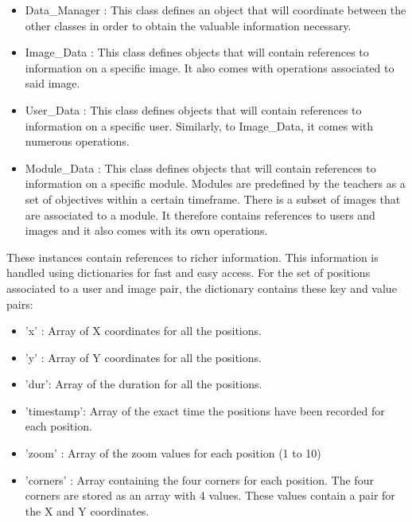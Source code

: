 \documentclass[a4paper,11pt]{report}
\numberwithin{figure}{section} %
\begin{document}
    \begin{itemize}
        \item[\textbullet] Data\_Manager : This class defines an object that will coordinate between the other classes in order to obtain the valuable information necessary.
        \item[\textbullet] Image\_Data : This class defines objects that will contain references to information on a specific image.
        It also comes with operations associated to said image.
        \item[\textbullet] User\_Data : This class defines objects that will contain references to information on a specific user.
        Similarly, to Image\_Data, it comes with numerous operations.
        \item[\textbullet] Module\_Data : This class defines objects that will contain references to information on a specific module.
        Modules are predefined by the teachers as a set of objectives within a certain timeframe.
        There is a subset of images that are associated to a module.
        It therefore contains references to users and images and it also comes with its own operations.
    \end{itemize}

    These instances contain references to richer information.
    This information is handled using dictionaries for fast and easy access.
    For the set of positions associated to a user and image pair, the dictionary contains these key and value pairs:
    \begin{itemize}
        \item[\textbullet] 'x' : Array of X coordinates for all the positions.
        \item[\textbullet] 'y' : Array of Y coordinates for all the positions.
        \item[\textbullet] 'dur': Array of the duration for all the positions.
        \item[\textbullet] 'timestamp': Array of the exact time the positions have been recorded for each position.
        \item[\textbullet] 'zoom' : Array of the zoom values for each position (1 to 10)
        \item[\textbullet] 'corners' : Array containing the four corners for each position.
        The four corners are stored as an array with 4 values.
        These values contain a pair for the X and Y coordinates.
    \end{itemize}
\end{document}
